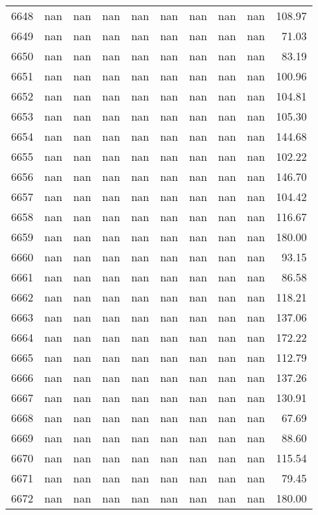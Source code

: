 \begin{tabular}{lrrrrrrrrr}
6648 & nan & nan & nan & nan & nan & nan & nan & nan & 108.97 \\
6649 & nan & nan & nan & nan & nan & nan & nan & nan & 71.03 \\
6650 & nan & nan & nan & nan & nan & nan & nan & nan & 83.19 \\
6651 & nan & nan & nan & nan & nan & nan & nan & nan & 100.96 \\
6652 & nan & nan & nan & nan & nan & nan & nan & nan & 104.81 \\
6653 & nan & nan & nan & nan & nan & nan & nan & nan & 105.30 \\
6654 & nan & nan & nan & nan & nan & nan & nan & nan & 144.68 \\
6655 & nan & nan & nan & nan & nan & nan & nan & nan & 102.22 \\
6656 & nan & nan & nan & nan & nan & nan & nan & nan & 146.70 \\
6657 & nan & nan & nan & nan & nan & nan & nan & nan & 104.42 \\
6658 & nan & nan & nan & nan & nan & nan & nan & nan & 116.67 \\
6659 & nan & nan & nan & nan & nan & nan & nan & nan & 180.00 \\
6660 & nan & nan & nan & nan & nan & nan & nan & nan & 93.15 \\
6661 & nan & nan & nan & nan & nan & nan & nan & nan & 86.58 \\
6662 & nan & nan & nan & nan & nan & nan & nan & nan & 118.21 \\
6663 & nan & nan & nan & nan & nan & nan & nan & nan & 137.06 \\
6664 & nan & nan & nan & nan & nan & nan & nan & nan & 172.22 \\
6665 & nan & nan & nan & nan & nan & nan & nan & nan & 112.79 \\
6666 & nan & nan & nan & nan & nan & nan & nan & nan & 137.26 \\
6667 & nan & nan & nan & nan & nan & nan & nan & nan & 130.91 \\
6668 & nan & nan & nan & nan & nan & nan & nan & nan & 67.69 \\
6669 & nan & nan & nan & nan & nan & nan & nan & nan & 88.60 \\
6670 & nan & nan & nan & nan & nan & nan & nan & nan & 115.54 \\
6671 & nan & nan & nan & nan & nan & nan & nan & nan & 79.45 \\
6672 & nan & nan & nan & nan & nan & nan & nan & nan & 180.00 \\

\end{tabular}
